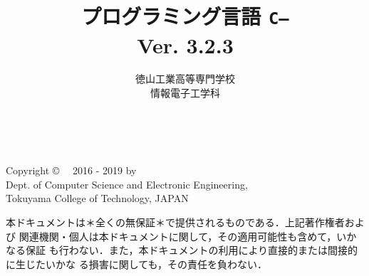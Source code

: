 \documentclass[11pt,a4j,twoside,dvipdfmx]{jbook}
\newcommand{\ver}{Ver. 3.2.3}
\newcommand{\cmm}{{\tt C--}}
\begin{document}
\setlength{\oddsidemargin}{10pt}
\setlength{\evensidemargin}{-10pt}
\setlength{\headsep}{1cm}
\frontmatter

\title{プログラミング言語 \cmm \\\ver}
\author{徳山工業高等専門学校\\情報電子工学科}
\date{}

\maketitle

\thispagestyle{empty}
~
\vfill
\begin{flushleft}
Copyright \copyright ~~ 2016 - 2019 by \\
Dept. of Computer Science and Electronic Engineering, \\
Tokuyama College of Technology, JAPAN
\end{flushleft}

\vspace{0.8cm}

本ドキュメントは＊全くの無保証＊で提供されるものである．上記著作権者および
関連機関・個人は本ドキュメントに関して，その適用可能性も含めて，いかなる保証
も行わない．また，本ドキュメントの利用により直接的または間接的に生じたいかな
る損害に関しても，その責任を負わない．
\setcounter{page}{0}

\tableofcontents

\mainmatter

\appendix

\backmatter
\pagestyle{empty}
\onecolumn
~
\end{document}
